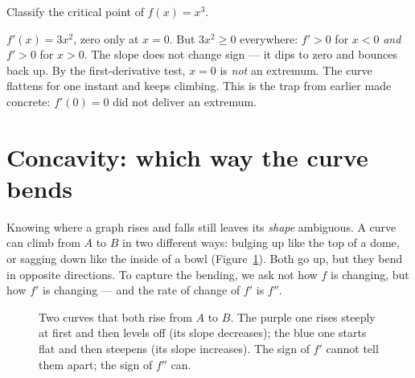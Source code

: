 \begin{example}\label{ch16:ex-no-extremum}
Classify the critical point of $f(x)=x^3$.

\smallskip
$f'(x)=3x^2$, zero only at $x=0$. But $3x^2\ge 0$ everywhere: $f'>0$ for $x<0$
\emph{and} $f'>0$ for $x>0$. The slope does not change sign --- it dips to zero and
bounces back up. By the first-derivative test, $x=0$ is \emph{not} an extremum. The
curve flattens for one instant and keeps climbing. This is the trap from earlier
made concrete: $f'(0)=0$ did not deliver an extremum.
\end{example}

\section{Concavity: which way the curve bends}

Knowing where a graph rises and falls still leaves its \emph{shape} ambiguous. A
curve can climb from $A$ to $B$ in two different ways: bulging up like the top
of a dome, or sagging down like the inside of a bowl
(Figure~\ref{ch16:fig-two-climbs}). Both go up, but they bend in opposite
directions. To capture the bending, we ask not how $f$ is changing, but how
$f'$ is changing --- and the rate of change of $f'$ is $f''$.

\begin{figure}[htbp]
\centering
{}
\caption{Two curves that both rise from $A$ to $B$. The purple one rises steeply
at first and then levels off (its slope decreases); the blue one starts flat and
then steepens (its slope increases). The sign of $f'$ cannot tell them apart; the
sign of $f''$ can.}
\label{ch16:fig-two-climbs}
\end{figure}

